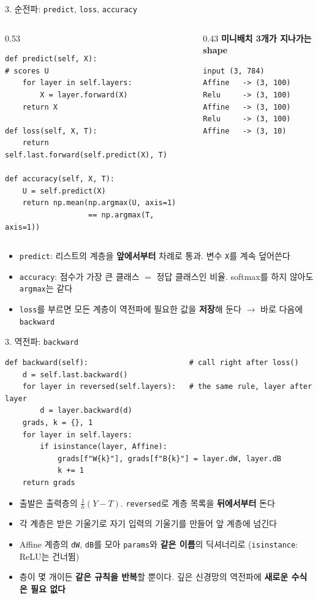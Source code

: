 \documentclass[aspectratio=169,11pt]{beamer}
\newcommand{\code}[1]{\texttt{#1}}
\begin{document}
\begin{frame}[fragile]{3. 순전파: \code{predict}, \code{loss}, \code{accuracy}}
\begin{columns}[T,onlytextwidth]
\begin{column}{0.53\textwidth}
\begin{lstlisting}
def predict(self, X):                     # scores U
    for layer in self.layers:
        X = layer.forward(X)
    return X

def loss(self, X, T):
    return self.last.forward(self.predict(X), T)

def accuracy(self, X, T):
    U = self.predict(X)
    return np.mean(np.argmax(U, axis=1)
                   == np.argmax(T, axis=1))
\end{lstlisting}
\end{column}
\begin{column}{0.43\textwidth}
\textbf{미니배치 3개가 지나가는 shape}
\begin{lstlisting}[style=outstyle]
input (3, 784)
Affine   -> (3, 100)
Relu     -> (3, 100)
Affine   -> (3, 100)
Relu     -> (3, 100)
Affine   -> (3, 10)
\end{lstlisting}
\end{column}
\end{columns}
\small
\begin{itemize}
\item \code{predict}: 리스트의 계층을 \textbf{앞에서부터} 차례로 통과. 변수 \code{X}를 계속 덮어쓴다
\item \code{accuracy}: 점수가 가장 큰 클래스 $=$ 정답 클래스인 비율. softmax를 하지 않아도 \code{argmax}는 같다
\item \code{loss}를 부르면 모든 계층이 역전파에 필요한 값을 \textbf{저장}해 둔다 $\to$ 바로 다음에 \code{backward}
\end{itemize}
\end{frame}

\begin{frame}[fragile]{3. 역전파: \code{backward}}
\begin{lstlisting}
def backward(self):                       # call right after loss()
    d = self.last.backward()
    for layer in reversed(self.layers):   # the same rule, layer after layer
        d = layer.backward(d)
    grads, k = {}, 1
    for layer in self.layers:
        if isinstance(layer, Affine):
            grads[f"W{k}"], grads[f"B{k}"] = layer.dW, layer.dB
            k += 1
    return grads
\end{lstlisting}
\begin{itemize}
\item 출발은 출력층의 $\frac1h(Y-T)$. \code{reversed}로 계층 목록을 \textbf{뒤에서부터} 돈다
\item 각 계층은 받은 기울기로 자기 입력의 기울기를 만들어 앞 계층에 넘긴다
\item Affine 계층의 \code{dW}, \code{dB}를 모아 \code{params}와 \textbf{같은 이름}의 딕셔너리로 (\code{isinstance}: ReLU는 건너뜀)
\item 층이 몇 개이든 \textbf{같은 규칙을 반복}할 뿐이다. 깊은 신경망의 역전파에 \textbf{새로운 수식은 필요 없다}
\end{itemize}
\end{frame}
\end{document}
